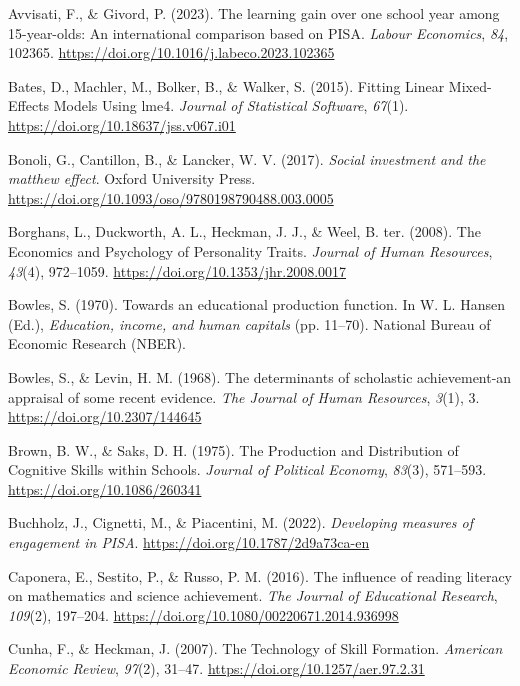 \documentclass[
]{article}
\newlength{\cslhangindent}
\newenvironment{CSLReferences}[2] %
 {\begin{list}{}{%
  \setlength{\itemindent}{0pt}
  \setlength{\leftmargin}{0pt}
  \setlength{\parsep}{0pt}
  \ifodd #1
   \setlength{\leftmargin}{\cslhangindent}
   \setlength{\itemindent}{-1\cslhangindent}
  \fi
  \setlength{\itemsep}{#2\baselineskip}}}
 {\end{list}}
\begin{document}
\begin{CSLReferences}{1}{0}
Avvisati, F., \& Givord, P. (2023). The learning gain over one school
year among 15-year-olds: An international comparison based on PISA.
\emph{Labour Economics}, \emph{84}, 102365.
\url{https://doi.org/10.1016/j.labeco.2023.102365}

Bates, D., Machler, M., Bolker, B., \& Walker, S. (2015). Fitting Linear
Mixed-Effects Models Using lme4. \emph{Journal of Statistical Software},
\emph{67}(1). \url{https://doi.org/10.18637/jss.v067.i01}

Bonoli, G., Cantillon, B., \& Lancker, W. V. (2017). \emph{Social
investment and the matthew effect}. Oxford University Press.
\url{https://doi.org/10.1093/oso/9780198790488.003.0005}

Borghans, L., Duckworth, A. L., Heckman, J. J., \& Weel, B. ter. (2008).
The Economics and Psychology of Personality Traits. \emph{Journal of
Human Resources}, \emph{43}(4), 972--1059.
\url{https://doi.org/10.1353/jhr.2008.0017}

Bowles, S. (1970). Towards an educational production function. In W. L.
Hansen (Ed.), \emph{Education, income, and human capitals} (pp. 11--70).
National Bureau of Economic Research (NBER).

Bowles, S., \& Levin, H. M. (1968). The determinants of scholastic
achievement-an appraisal of some recent evidence. \emph{The Journal of
Human Resources}, \emph{3}(1), 3. \url{https://doi.org/10.2307/144645}

Brown, B. W., \& Saks, D. H. (1975). The Production and Distribution of
Cognitive Skills within Schools. \emph{Journal of Political Economy},
\emph{83}(3), 571--593. \url{https://doi.org/10.1086/260341}

Buchholz, J., Cignetti, M., \& Piacentini, M. (2022). \emph{Developing
measures of engagement in PISA}.
\url{https://doi.org/10.1787/2d9a73ca-en}

Caponera, E., Sestito, P., \& Russo, P. M. (2016). The influence of
reading literacy on mathematics and science achievement. \emph{The
Journal of Educational Research}, \emph{109}(2), 197--204.
\url{https://doi.org/10.1080/00220671.2014.936998}

Cunha, F., \& Heckman, J. (2007). The Technology of Skill Formation.
\emph{American Economic Review}, \emph{97}(2), 31--47.
\url{https://doi.org/10.1257/aer.97.2.31}


\end{CSLReferences}
\end{document}
